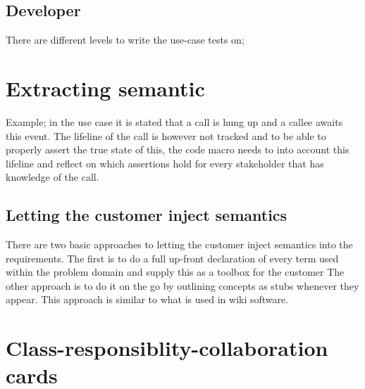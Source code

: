 \subsection{Developer}
There are different levels to write the use-case tests on;


%


\section{Extracting semantic}
Example; in the use case it is stated that a call is hung up and a callee awaits this event. The lifeline of the call is however not tracked and to be able to properly assert the true state of this, the code macro needs to into account this lifeline and reflect on which assertions hold for every stakeholder that has knowledge of the call. %

\subsection{Letting the customer inject semantics}

There are two basic approaches to letting the customer inject semantics into the requirements. The first is to do a full up-front declaration of every term used within the problem domain and supply this as a toolbox for the customer %
The other approach is to do it on the go by outlining concepts as stubs whenever they appear. This approach is similar to what is used in wiki software. %

\section{Class-responsiblity-collaboration cards}

